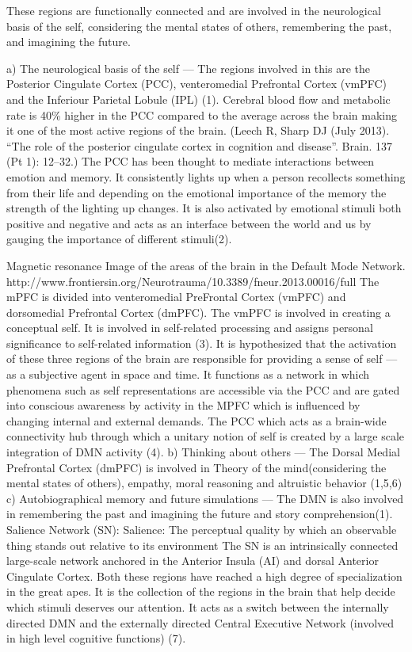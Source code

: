 \documentclass[twocolumn]{article}
\begin{document}
These regions are functionally connected and are involved in the neurological basis
of the self, considering the mental states of others, remembering the past, and
imagining the future.

a) The neurological basis of the self —
The regions involved in this are the Posterior Cingulate Cortex (PCC), venteromedial Prefrontal Cortex (vmPFC) and the Inferiour Parietal Lobule (IPL) (1).
Cerebral blood flow and metabolic rate is 40\% higher in the PCC compared to the average across the brain making it one of the most active regions of the brain. (Leech R, Sharp DJ (July 2013). “The role of the posterior cingulate cortex in cognition and disease”. Brain. 137 (Pt 1): 12–32.)
The PCC has been thought to mediate interactions between emotion and memory. It consistently lights up when a person recollects something from their life and depending on the emotional importance of the memory the strength of the lighting up changes. It is also activated by emotional stimuli both positive and negative and acts as an interface between the world and us by gauging the importance of different stimuli(2).

Magnetic resonance Image of the areas of the brain in the Default Mode Network. http://www.frontiersin.org/Neurotrauma/10.3389/fneur.2013.00016/full
The mPFC is divided into venteromedial PreFrontal Cortex (vmPFC) and dorsomedial Prefrontal Cortex (dmPFC). The vmPFC is involved in creating a conceptual self. It is involved in self-related processing and assigns personal significance to self-related information (3).
It is hypothesized that the activation of these three regions of the brain are responsible for providing a sense of self — as a subjective agent in space and time. It functions as a network in which phenomena such as self representations are accessible via the PCC and are gated into conscious awareness by activity in the MPFC which is influenced by changing internal and external demands. The PCC which acts as a brain-wide connectivity hub through which a unitary notion of self is created by a large scale integration of DMN activity (4).
b) Thinking about others —
The Dorsal Medial Prefrontal Cortex (dmPFC) is involved in Theory of the mind(considering the mental states of others), empathy, moral reasoning and altruistic behavior (1,5,6)
c) Autobiographical memory and future simulations —
The DMN is also involved in remembering the past and imagining the future and story comprehension(1).
Salience Network (SN):
Salience: The perceptual quality by which an observable thing stands out relative to its environment
The SN is an intrinsically connected large-scale network anchored in the Anterior Insula (AI) and dorsal Anterior Cingulate Cortex. Both these regions have reached a high degree of specialization in the great apes. It is the collection of the regions in the brain that help decide which stimuli deserves our attention. It acts as a switch between the internally directed DMN and the externally directed Central Executive Network (involved in high level cognitive functions) (7).
\end{document}
